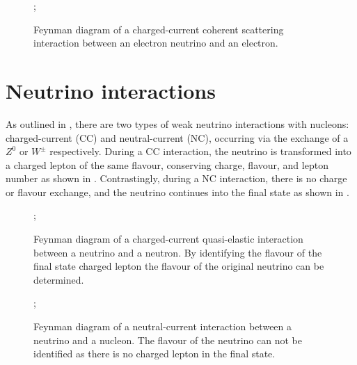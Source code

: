 \begin{figure} %
    ;
    \caption[Feynman diagram of a charged-current coherent scattering interaction]
    {Feynman diagram of a charged-current coherent scattering interaction between an electron
        neutrino and an electron.}
    \label{fig:coherent_scattering}
\end{figure}

\section{Neutrino interactions} %
\label{sec:theory_interactions} %

As outlined in , there are two types of weak neutrino
interactions with nucleons: charged-current (CC) and neutral-current (NC), occurring via the
exchange of a $Z^{0}$ or $W^{\pm}$ respectively. During a CC interaction, the neutrino is
transformed into a charged lepton of the same flavour, conserving charge, flavour, and lepton
number as shown in . Contrastingly, during a NC interaction, there
is no charge or flavour exchange, and the neutrino continues into the final state as shown in
.

\begin{figure} %
    ;
    \caption[Feynman diagram of a charged-current interaction]
    {Feynman diagram of a charged-current quasi-elastic interaction between a neutrino and a
        neutron. By identifying the flavour of the final state charged lepton the flavour of the
        original neutrino can be determined.}
    \label{fig:cc_interaction}
\end{figure}

\begin{figure} %
    ;
    \caption[Feynman diagram of a neutral-current interaction]
    {Feynman diagram of a neutral-current interaction between a neutrino and a nucleon. The
        flavour of the neutrino can not be identified as there is no charged lepton in the final
        state.}
    \label{fig:nc_interaction}
\end{figure}

